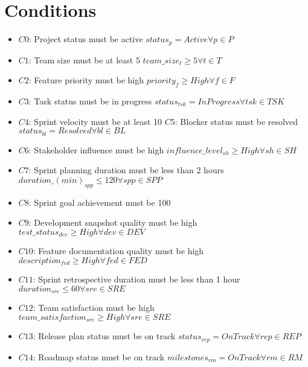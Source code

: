\documentclass{article}
\begin{document}
\section{Conditions}
\begin{itemize}
    \item $C0$: Project status must be active $status_p = Active \forall p \in P$
    \item $C1$: Team size must be at least 5 $team\_size_t \geq 5 \forall t \in T$
    \item $C2$: Feature priority must be high $priority_f \geq High \forall f \in F$
    \item $C3$: Task status must be in progress $status_{tsk} = In Progress \forall tsk \in TSK$
    \item $C4$: Sprint velocity must be at least 10 $C5$: Blocker status must be resolved $status_{bl} = Resolved \forall bl \in BL$
    \item $C6$: Stakeholder influence must be high $influence\_level_{sh} \geq High \forall sh \in SH$
    \item $C7$: Sprint planning duration must be less than 2 hours $duration\_(min)_{spp} \leq 120 \forall spp \in SPP$
    \item $C8$: Sprint goal achievement must be 100%
    \item $C9$: Development snapshot quality must be high $test\_status_{dev} \geq High \forall dev \in DEV$
    \item $C10$: Feature documentation quality must be high $description_{fed} \geq High \forall fed \in FED$
    \item $C11$: Sprint retrospective duration must be less than 1 hour $duration_{sre} \leq 60 \forall sre \in SRE$
    \item $C12$: Team satisfaction must be high $team\_satisfaction_{sre} \geq High \forall sre \in SRE$
    \item $C13$: Release plan status must be on track $status_{rep} = On Track \forall rep \in REP$
    \item $C14$: Roadmap status must be on track $milestones_{rm} = On Track \forall rm \in RM$
\end{itemize}
\end{document}
